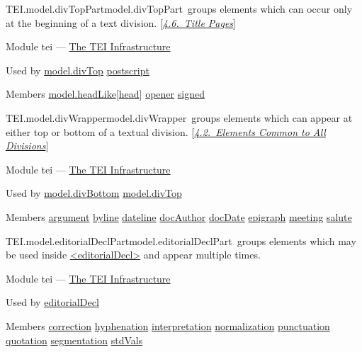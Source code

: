 \begin{reflist}
\item[]\begin{specHead}{TEI.model.divTopPart}{model.divTopPart} groups elements which can occur only at the beginning of a text division. [\textit{\hyperref[DSTITL]{4.6.\ Title Pages}}]\end{specHead} 
    \item[{Module}]
  tei — \hyperref[ST]{The TEI Infrastructure}
    \item[{Used by}]
  \hyperref[TEI.model.divTop]{model.divTop} \hyperref[TEI.postscript]{postscript}
    \item[{Members}]
  \hyperref[TEI.model.headLike]{model.headLike}[\hyperref[TEI.head]{head}] \hyperref[TEI.opener]{opener} \hyperref[TEI.signed]{signed}
\end{reflist}  
\begin{reflist}
\item[]\begin{specHead}{TEI.model.divWrapper}{model.divWrapper} groups elements which can appear at either top or bottom of a textual division. [\textit{\hyperref[DSDTB]{4.2.\ Elements Common to All Divisions}}]\end{specHead} 
    \item[{Module}]
  tei — \hyperref[ST]{The TEI Infrastructure}
    \item[{Used by}]
  \hyperref[TEI.model.divBottom]{model.divBottom} \hyperref[TEI.model.divTop]{model.divTop}
    \item[{Members}]
  \hyperref[TEI.argument]{argument} \hyperref[TEI.byline]{byline} \hyperref[TEI.dateline]{dateline} \hyperref[TEI.docAuthor]{docAuthor} \hyperref[TEI.docDate]{docDate} \hyperref[TEI.epigraph]{epigraph} \hyperref[TEI.meeting]{meeting} \hyperref[TEI.salute]{salute}
\end{reflist}  
\begin{reflist}
\item[]\begin{specHead}{TEI.model.editorialDeclPart}{model.editorialDeclPart} groups elements which may be used inside \hyperref[TEI.editorialDecl]{<editorialDecl>} and appear multiple times.\end{specHead} 
    \item[{Module}]
  tei — \hyperref[ST]{The TEI Infrastructure}
    \item[{Used by}]
  \hyperref[TEI.editorialDecl]{editorialDecl}
    \item[{Members}]
  \hyperref[TEI.correction]{correction} \hyperref[TEI.hyphenation]{hyphenation} \hyperref[TEI.interpretation]{interpretation} \hyperref[TEI.normalization]{normalization} \hyperref[TEI.punctuation]{punctuation} \hyperref[TEI.quotation]{quotation} \hyperref[TEI.segmentation]{segmentation} \hyperref[TEI.stdVals]{stdVals}
\end{reflist}  
